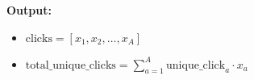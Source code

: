 \documentclass{article}
\begin{document}
\textbf{Output:}
\begin{itemize}
    \item \( \text{clicks} = [x_{1}, x_{2}, \ldots, x_{A}] \)
    \item \( \text{total\_unique\_clicks} = \sum_{a=1}^{A} \text{unique\_click}_{a} \cdot x_a \)
\end{itemize}
\end{document}
